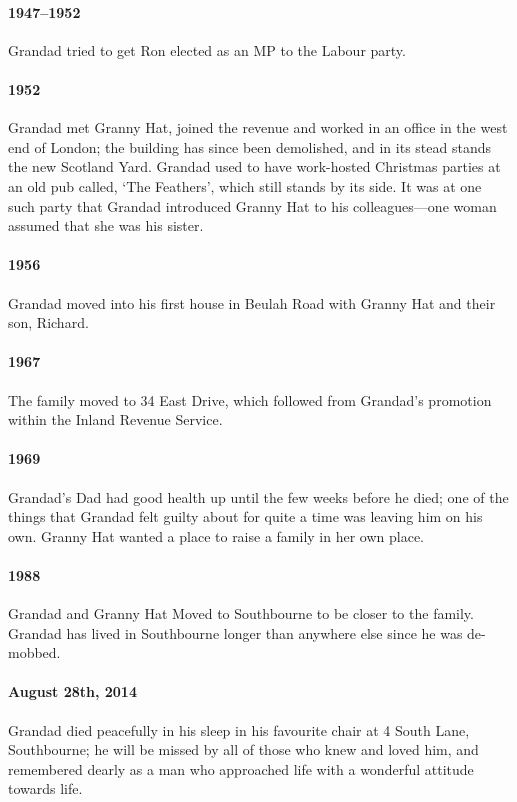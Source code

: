 \paragraph{1947--1952} Grandad tried to get Ron elected as an MP to the Labour party. 

\paragraph{1952} Grandad met Granny Hat, joined the revenue and worked in an office
in the west end of London; the building has since been demolished, and in its stead
stands the new Scotland Yard.
Grandad used to have work-hosted Christmas parties at an old pub called, `The Feathers', which still stands by its side.
It was at one such party that Grandad introduced Granny Hat to his colleagues---one woman
assumed that she was his sister.

\paragraph{1956} Grandad moved into his first house in Beulah Road with Granny Hat and their son, Richard.
\paragraph{1967} The family moved to 34 East Drive, which followed from Grandad's promotion within
the Inland Revenue Service.
\paragraph{1969} Grandad's Dad had good health up until the few weeks before he died; one
of the things that Grandad felt guilty about for quite a time was leaving him on his own. Granny Hat  wanted
a place to raise a family in her own place.
\paragraph{1988} Grandad and Granny Hat Moved to Southbourne to be closer to the family. Grandad
has lived in Southbourne longer than anywhere else since he was de-mobbed.

\paragraph{August 28th, 2014} Grandad died peacefully in his sleep in his favourite chair at 4 South Lane, Southbourne; he will be missed by all of those
who knew and loved him, and remembered dearly as a man who approached life with a wonderful attitude
towards life.

